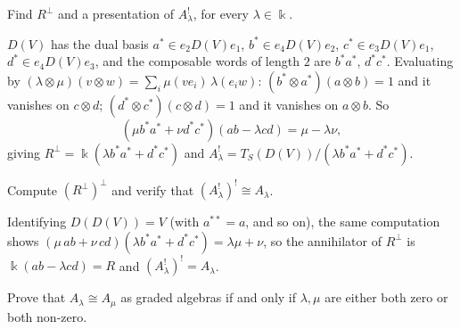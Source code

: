 \documentclass[11pt,a4paper]{exam}
\newcommand{\kk}{\Bbbk}
\begin{document}
\begin{questions}
\begin{parts}
\begin{subparts}
\begin{solution}
\end{solution}

\subpart Find $R^\perp$ and a presentation of $A_\lambda^!$, for every $\lambda\in\kk$.
\begin{solution}
$D(V)$ has the dual basis $a^*\in e_2D(V)e_1$, $b^*\in e_4D(V)e_2$, $c^*\in e_3D(V)e_1$, $d^*\in e_4D(V)e_3$, and the composable words of length $2$ are $b^*a^*$, $d^*c^*$.
Evaluating by $(\lambda\otimes\mu)(v\otimes w)=\sum_i\mu(ve_i)\,\lambda(e_iw)$: $(b^*\otimes a^*)(a\otimes b)=1$ and it vanishes on $c\otimes d$; $(d^*\otimes c^*)(c\otimes d)=1$ and it vanishes on $a\otimes b$.
So
\[
  (\mu b^*a^*+\nu d^*c^*)(ab-\lambda cd)=\mu-\lambda\nu,
\]
giving $R^\perp=\kk(\lambda b^*a^*+d^*c^*)$ and $A_\lambda^!=T_S(D(V))/(\lambda b^*a^*+d^*c^*)$.
\end{solution}
\subpart Compute $(R^\perp)^\perp$ and verify that $(A_\lambda^!)^!\cong A_\lambda$.
\begin{solution}
Identifying $D(D(V))=V$ (with $a^{**}=a$, and so on), the same computation shows $(\mu\,ab+\nu\,cd)(\lambda b^*a^*+d^*c^*)=\lambda\mu+\nu$, so the annihilator of $R^\perp$ is $\kk(ab-\lambda cd)=R$ and $(A_\lambda^!)^!=A_\lambda$.
\end{solution}
\subpart Prove that $A_\lambda\cong A_\mu$ as graded algebras if and only if $\lambda,\mu$ are either both zero or both non-zero.


\end{subparts}
\end{parts}
\end{questions}
\end{document}
